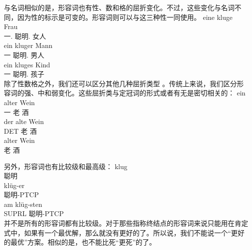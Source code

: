 与名词相似的是，形容词也有性、数和格的屈折变化。不过，这些变化与名词不同，因为性的标示是可变的。形容词则可以与这三种性一同使用。
\eal
\ex 
\gll eine kluge Frau\\
	 一.\fem{} 聪明.\fem{} 女人\\
\ex 
\gll ein kluger Mann\\
	 一 聪明.\mas{} 男人\\
\ex 
\gll ein kluges Kind\\
	 一 聪明.\neu{} 孩子\\
\zl
除了性数格之外，我们还可以区分其他几种屈折类型\label{page-Flexionsklasse-Wunderlich} 。传统上来说，我们区分形容词的强、中和弱变化。这些屈折类与定冠词的形式或者有无是密切相关的：
\eal
\ex 
\gll ein alter Wein\\
     一 老 酒\\
\ex
\gll der alte Wein\\
     DET 老 酒\\
\ex 
\gll alter Wein\\
     老 酒\\
\zl


另外，形容词也有比较级和最高级：
\eal
\ex 
\gll klug\\
	 聪明\\
\ex 
\gll klüg-er\\
	 聪明-PTCP\\
\ex 
\gll am klüg-sten\\
     SUPRL 聪明-PTCP\\
\zl
并不是所有的形容词都有比较级。对于那些指称终结点的形容词来说只能用在肯定式中，如果有一个最优解，那么就没有更好的了。所以说，我们不能说一个“更好的最优”方案。相似的是，也不能比死“更死”的了。

